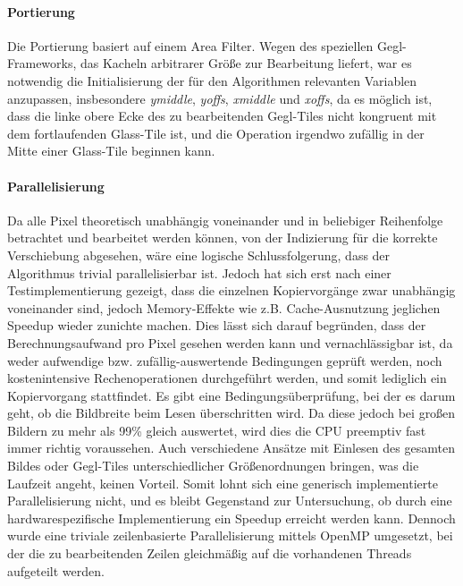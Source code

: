 \paragraph{Portierung}
Die Portierung basiert auf einem Area Filter. Wegen des speziellen Gegl-Frameworks, das Kacheln arbitrarer Größe zur Bearbeitung liefert, war es notwendig die Initialisierung der für den Algorithmen relevanten Variablen anzupassen, insbesondere \emph{ymiddle}, \emph{yoffs}, \emph{xmiddle} und \emph{xoffs}, da es möglich ist, dass die linke obere Ecke des zu bearbeitenden Gegl-Tiles nicht kongruent mit dem fortlaufenden Glass-Tile ist, und die Operation irgendwo zufällig in der Mitte einer Glass-Tile beginnen kann.

\paragraph{Parallelisierung}
Da alle Pixel theoretisch unabhängig voneinander und in beliebiger Reihenfolge betrachtet und bearbeitet werden können, von der Indizierung für die korrekte Verschiebung abgesehen, wäre eine logische Schlussfolgerung, dass der Algorithmus trivial parallelisierbar ist. Jedoch hat sich erst nach einer Testimplementierung gezeigt, dass die einzelnen Kopiervorgänge zwar unabhängig voneinander sind, jedoch Memory-Effekte wie z.B. Cache-Ausnutzung jeglichen Speedup wieder zunichte machen. Dies lässt sich darauf begründen, dass der Berechnungsaufwand pro Pixel gesehen werden kann und vernachlässigbar ist, da weder aufwendige bzw. zufällig-auswertende Bedingungen geprüft werden, noch kostenintensive Rechenoperationen durchgeführt werden, und somit lediglich ein Kopiervorgang stattfindet. Es gibt eine Bedingungsüberprüfung, bei der es darum geht, ob die Bildbreite beim Lesen überschritten wird. Da diese jedoch bei großen Bildern zu mehr als 99\% gleich auswertet, wird dies die CPU preemptiv fast immer richtig voraussehen. Auch verschiedene Ansätze mit Einlesen des gesamten Bildes oder Gegl-Tiles unterschiedlicher Größenordnungen bringen, was die Laufzeit angeht, keinen Vorteil. Somit lohnt sich eine generisch implementierte Parallelisierung nicht, und es bleibt Gegenstand zur Untersuchung, ob durch eine hardwarespezifische Implementierung ein Speedup erreicht werden kann.\newline
Dennoch wurde eine triviale zeilenbasierte Parallelisierung mittels OpenMP umgesetzt, bei der die zu bearbeitenden Zeilen gleichmäßig auf die vorhandenen Threads aufgeteilt werden.
